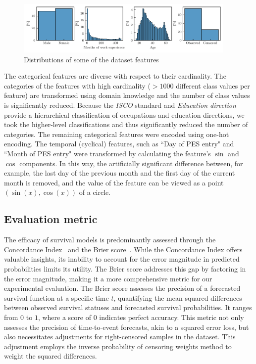 \documentclass[3p,review,authoryear]{elsarticle}
\begin{document}
\begin{figure}[h!]
    \centering
    \includegraphics[width=0.95\textwidth]{feature_distributions.pdf}
    \caption{Distributions of some of the dataset features \citep{Andonovikj_2024}}
    \label{fig:grid_prob}
\end{figure}


The categorical features are diverse with respect to their cardinality.
The categories of the features with high cardinality ($>1000$ different class values per feature) are transformed using domain knowledge and the number of class values is significantly reduced.
Because the \emph{ISCO} standard and \emph{Education direction} provide a hierarchical classification of occupations and education directions, we took the higher-level classifications and thus significantly reduced the number of categories.
The remaining categorical features were encoded using one-hot encoding.
The temporal (cyclical) features, such as ``Day of PES entry" and ``Month of PES entry" were transformed by calculating the feature's $\sin$ and $\cos$ components.
In this way, the artificially significant difference between, for example, the last day of the previous month and the first day of the current month is removed, and the value of the feature can be viewed as a point $\left(\sin(x), \cos(x)\right)$ of a circle.

\subsection{Evaluation metric}

The efficacy of survival models is predominantly assessed through the Concordance Index~\citep{brentnall2018use} and the Brier score~\citep{gerds2006consistent}.
While the Concordance Index offers valuable insights, its inability to account for the error magnitude in predicted probabilities limits its utility.
The Brier score addresses this gap by factoring in the error magnitude, making it a more comprehensive metric for our experimental evaluation.
The Brier score assesses the precision of a forecasted survival function at a specific time $t$, quantifying the mean squared differences between observed survival statuses and forecasted survival probabilities.
It ranges from $0$ to $1$, where a score of $0$ indicates perfect accuracy.
This metric not only assesses the precision of time-to-event forecasts, akin to a squared error loss, but also necessitates adjustments for right-censored samples in the dataset.
This adjustment employs the inverse probability of censoring weights method to weight the squared differences.
\end{document}
